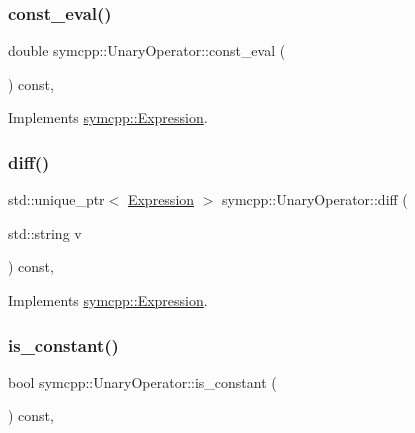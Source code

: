 \subsubsection{\texorpdfstring{const\_eval()}{const\_eval()}}
{\footnotesize\ttfamily double symcpp\+::\+Unary\+Operator\+::const\+\_\+eval (\begin{DoxyParamCaption}{ }\end{DoxyParamCaption}) const\hspace{0.3cm}{\ttfamily [override]}, {\ttfamily [virtual]}}



Implements \mbox{\hyperlink{classsymcpp_1_1Expression_a81c8069347f586cb5632338d97c278ad}{symcpp\+::\+Expression}}.

\mbox{\label{classsymcpp_1_1UnaryOperator_a73f6af837c67e65504e4bb82111d9557}} 
\subsubsection{\texorpdfstring{diff()}{diff()}}
{\footnotesize\ttfamily std\+::unique\+\_\+ptr$<$ \mbox{\hyperlink{classsymcpp_1_1Expression}{Expression}} $>$ symcpp\+::\+Unary\+Operator\+::diff (\begin{DoxyParamCaption}\item[{std\+::string}]{v }\end{DoxyParamCaption}) const\hspace{0.3cm}{\ttfamily [override]}, {\ttfamily [virtual]}}



Implements \mbox{\hyperlink{classsymcpp_1_1Expression_a032fe8da79d5e231ca2d21a201c8f32d}{symcpp\+::\+Expression}}.

\mbox{\label{classsymcpp_1_1UnaryOperator_abb499ba635a63dfa605fc3639509ac1c}} 
\subsubsection{\texorpdfstring{is\_constant()}{is\_constant()}}
{\footnotesize\ttfamily bool symcpp\+::\+Unary\+Operator\+::is\+\_\+constant (\begin{DoxyParamCaption}{ }\end{DoxyParamCaption}) const\hspace{0.3cm}{\ttfamily [override]}, {\ttfamily [virtual]}}



